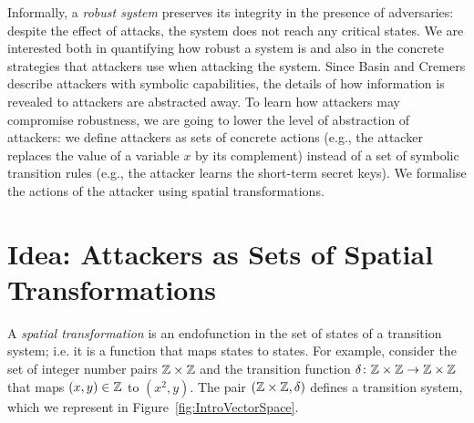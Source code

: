 Informally, a \emph{robust system} preserves its integrity in the presence of adversaries: despite the effect of attacks, the system does not reach any critical states. %
We are interested both in quantifying how robust a system is and also in the concrete strategies that attackers use when attacking the system. Since Basin and Cremers describe attackers with symbolic capabilities, 
the details of how information is revealed to attackers are abstracted away. %
To learn how attackers may compromise robustness, we are going to lower the level of abstraction of attackers: we define attackers as sets of concrete actions (e.g., the attacker replaces the value of a variable $x$ by its complement) instead of a set of symbolic transition rules (e.g., the attacker learns the short-term secret keys). We formalise the actions of the attacker using {spatial transformations}.%

\section{Idea: Attackers as Sets of Spatial Transformations}
A \emph{spatial transformation} is an endofunction in the set of states of a transition system; i.e. it is a function that maps states to states. For example, consider the set of integer number pairs $\mathbb{Z}\times\mathbb{Z}$ and the transition function $\delta\colon \mathbb{Z}\times\mathbb{Z}\rightarrow \mathbb{Z}\times\mathbb{Z}$ that maps $(x,y)\in \mathbb{Z}$ to $(x^2,y)$. The pair $(\mathbb{Z}\times\mathbb{Z}, \delta)$ defines a transition system, which we represent in Figure~\ref{fig:IntroVectorSpace}.

